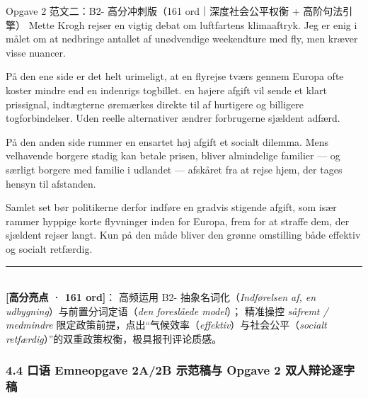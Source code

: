 \begin{emailbox}{Opgave 2 范文二：B2- 高分冲刺版（161 ord｜深度社会公平权衡 + 高阶句法引擎）}
Mette Krogh rejser en vigtig debat om luftfartens klimaaftryk. Jeg er enig i målet om at nedbringe antallet af unødvendige weekendture med fly, men  kræver visse nuancer.

\vspace{0.25em}
På den ene side er det helt urimeligt, at en flyrejse tværs gennem Europa ofte koster mindre end en indenrigs togbillet.  en højere afgift vil sende et klart prissignal,  indtægterne øremærkes direkte til  af hurtigere og billigere togforbindelser. Uden reelle alternativer ændrer forbrugerne sjældent adfærd.

\vspace{0.25em}
På den anden side rummer en ensartet høj afgift et socialt dilemma. Mens velhavende borgere stadig kan betale prisen, bliver almindelige familier --- og særligt borgere med familie i udlandet --- afskåret fra at rejse hjem,  der tages hensyn til afstanden.

\vspace{0.25em}
Samlet set bør politikerne derfor indføre en gradvis stigende afgift, som især rammer hyppige korte flyvninger inden for Europa, frem for at straffe dem, der sjældent rejser langt. Kun på den måde bliver den grønne omstilling både effektiv og socialt retfærdig.

\vspace{0.3em}
\rule{\linewidth}{0.4pt}\\[0.2em]
\small\textbf{\color{NCDNavy}[高分亮点 · 161 ord]}： 高频运用 B2- 抽象名词化（\textit{Indførelsen af, en udbygning}）与前置分词定语（\textit{den foreslåede model}）； 精准操控 \textit{såfremt / medmindre} 限定政策前提，点出“气候效率（\textit{effektiv}）与社会公平（\textit{socialt retfærdig}）”的双重政策权衡，极具报刊评论质感。
\end{emailbox}

\subsubsection*{4.4 口语 Emneopgave 2A/2B 示范稿与 Opgave 2 双人辩论逐字稿}

